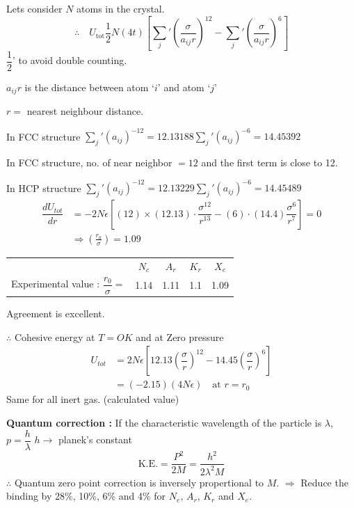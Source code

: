 Lets consider $N$ atoms in the crystal.
$$
\therefore\quad U_{\text{tot}}\frac{1}{2}N(4t)\left[{\sum\limits_{j}}'\left(\dfrac{\sigma}{a_{ij}r}\right)^{12}-{\sum\limits_{j}}'\left(\dfrac{\sigma}{a_{ij}r}\right)^{6}\right]
$$
$\dfrac{1}{2}$' to avoid double counting.

\eject

$a_{ij}r$ is the distance between atom `$i$' and atom `$j$'

$r=$ nearest neighbour distance.

\smallskip

In FCC structure ${\sum\limits_{j}}'(a_{ij})^{-12}=12.13188$\quad ${\sum\limits_{j}}'(a_{ij})^{-6}=14.45392$

\smallskip

In FCC structure, no. of near neighbor $=12$ and the first term is close to 12.

\smallskip

In HCP structure ${\sum\limits_{j}}'(a_{ij})^{-12}=12.13229$\quad ${\sum\limits_{j}}'(a_{ij})^{-6}=14.45489$
\begin{align*}
\dfrac{dU_{tot}}{dr} &= -2N\epsilon \left[(12)\times (12.13)\cdot \dfrac{\sigma^{12}}{r^{13}}-(6)\cdot (14.4)\dfrac{\sigma^{6}}{r^{7}}\right]=0\\[3pt]
&\Rightarrow \left(\frac{r_{0}}{\sigma}\right)=1.09
\end{align*}
\begin{center}
\begin{tabular}{lcccc}
 & $N_{c}$ & $A_{r}$ & $K_{r}$ & $X_{e}$\\
Experimental value : $\dfrac{r_{0}}{\sigma}=$ & 1.14 & 1.11 & 1.1 & 1.09\\
\end{tabular}
\end{center}
Agreement is excellent.

$\therefore$ Cohesive energy at $T=OK$ and at Zero pressure
\begin{align*}
U_{tot} &= 2N\epsilon \left[12.13\left(\dfrac{\sigma}{r}\right)^{12}-14.45\left(\dfrac{\sigma}{r}\right)^{6}\right]\\[2pt]
&= (-2.15)(4N\epsilon)\quad \text{at } r=r_{0}
\end{align*}
Same for all inert gas. (calculated value)

\noindent
{\bf Quantum correction :} If the characteristic wavelength of the particle is $\lambda$, $p=\dfrac{h}{\lambda}$ $h\to$ planek's constant
$$
\text{K.E.} = \dfrac{P^{2}}{2M}=\dfrac{h^{2}}{2\lambda^{2}M}
$$
$\therefore$ Quantum zero point correction is inversely propertional to $M$. $\Rightarrow$ Reduce the binding by 28\%, 10\%, 6\% and 4\% for $N_{e}$, $A_{r}$, $K_{r}$ and $X_{e}$.

